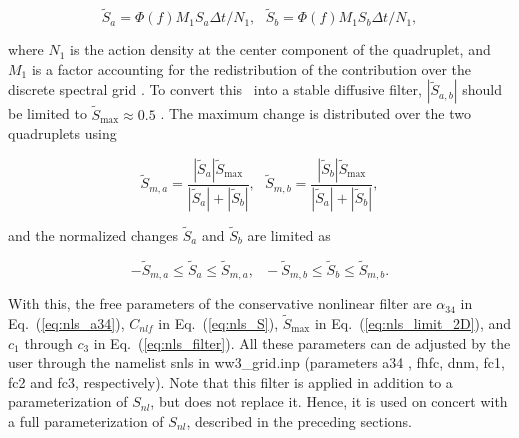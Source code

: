 \begin{equation}
\tilde{S}_a = \Phi(f) M_1 S_a \Delta t / N_1
, \:\:\:
\tilde{S}_b = \Phi(f) M_1 S_b \Delta t / N_1
, \label{eq:nls_tilde_s}
\end{equation}

\noindent 
where $N_1$ is the action density at the center component of the quadruplet,
and $M_1$ is a factor accounting for the redistribution of the contribution
over the discrete spectral grid \citep[for details, see][]{tol:OMOD11}. To
convert this \dia\ into a stable diffusive filter, $|\tilde{S}_{a,b}|$ should
be limited to $\tilde{S}_{\max} \approx 0.5$ \citep[e.g.,][]{bk:Fle88}. The
maximum change is distributed over the two quadruplets using

\begin{equation}
\tilde{S}_{m,a} = 
   \frac{|\tilde{S}_a|\tilde{S}_{\max}}{|\tilde{S}_a|+|\tilde{S}_b|}
 , \:\:\:
\tilde{S}_{m,b} = 
   \frac{|\tilde{S}_b|\tilde{S}_{\max}}{|\tilde{S}_a|+|\tilde{S}_b|}
 ,
\label{eq:nls_limit_2D}
\end{equation}

\noindent
and the normalized changes $\tilde{S}_a$ and $\tilde{S}_b$ are limited as

\begin{equation}
- \tilde{S}_{m,a} \leq \tilde{S}_a \leq \tilde{S}_{m,a}, \:\:\:
- \tilde{S}_{m,b} \leq \tilde{S}_b \leq \tilde{S}_{m,b}.
\label{eq:nls_limit}
\end{equation}

\noindent 
With this, the free parameters of the conservative nonlinear filter are
$\alpha_{34}$ in Eq.~(\ref{eq:nls_a34}), $C_{nlf}$ in Eq.~(\ref{eq:nls_S}),
$\tilde{S}_{\max}$ in Eq.~(\ref{eq:nls_limit_2D}), and $c_1$ through $c_3$ in
Eq.~(\ref{eq:nls_filter}). All these parameters can de adjusted by the user
through the namelist {\F snls} in {\file ww3\_grid.inp} (parameters {\F a34} ,
{\F fhfc}, {\F dnm}, {\F fc1}, {\F fc2} and {\F fc3}, respectively).  Note
that this filter is applied in addition to a parameterization of $S_{nl}$, but
does not replace it. Hence, it is used on concert with a full parameterization
of $S_{nl}$, described in the preceding sections.
